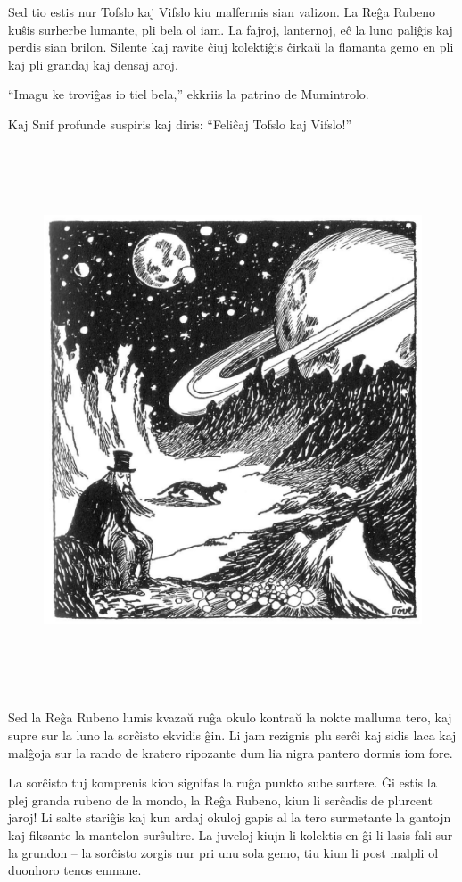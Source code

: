 Sed tio estis nur Tofslo kaj Vifslo kiu malfermis sian valizon. La Reĝa Rubeno kuŝis surherbe lumante, pli bela ol iam. La fajroj, lanternoj, eĉ la luno paliĝis kaj perdis sian brilon. Silente kaj ravite ĉiuj kolektiĝis ĉirkaŭ la flamanta gemo en pli kaj pli grandaj kaj densaj aroj.

``Imagu ke troviĝas io tiel bela,'' ekkriis la patrino de Mumintrolo.

Kaj Snif profunde suspiris kaj diris: ``Feliĉaj Tofslo kaj Vifslo!''

\begin{figure}[htbp]
\centering
\includegraphics[width=425pt,height=460pt]{_35.jpg}
\caption{}
\label{_35}
\end{figure}

Sed la Reĝa Rubeno lumis kvazaŭ ruĝa okulo kontraŭ la nokte malluma tero, kaj supre sur la luno la sorĉisto ekvidis ĝin. Li jam rezignis plu serĉi kaj sidis laca kaj malĝoja sur la rando de kratero ripozante dum lia nigra pantero dormis iom fore.

La sorĉisto tuj komprenis kion signifas la ruĝa punkto sube surtere. Ĝi estis la plej granda rubeno de la mondo, la Reĝa Rubeno, kiun li serĉadis de plurcent jaroj! Li salte stariĝis kaj kun ardaj okuloj gapis al la tero surmetante la gantojn kaj fiksante la mantelon surŝultre. La juveloj kiujn li kolektis en ĝi li lasis fali sur la grundon -- la sorĉisto zorgis nur pri unu sola gemo, tiu kiun li post malpli ol duonhoro tenos enmane.

